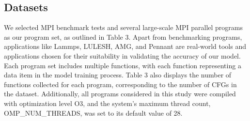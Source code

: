 \documentclass[lineno,sn-mathphys]{sn-jnl}%
\theoremstyle{thmstyleone}%
\theoremstyle{thmstyletwo}%
\theoremstyle{thmstylethree}%
\begin{document}
 \subsection{Datasets}
 We selected MPI benchmark tests and several large-scale MPI parallel programs as our program set, as outlined in Table 3. Apart from benchmarking programs, applications like Lammps, LULESH, AMG, and Pennant are real-world tools and applications chosen for their suitability in validating the accuracy of our model. Each program set includes multiple functions, with each function representing a data item in the model training process. Table 3 also displays the number of functions collected for each program, corresponding to the number of CFGs in the dataset. Additionally, all programs considered in this study were compiled with optimization level O3, and the system's maximum thread count, OMP\_NUM\_THREADS, was set to its default value of 28.
\end{document}

